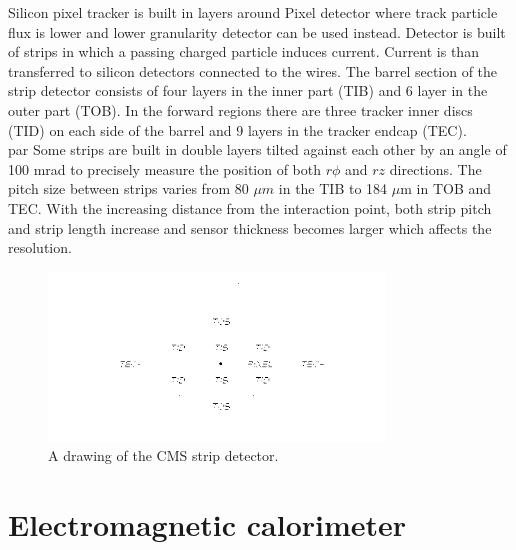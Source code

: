 Silicon pixel tracker is built in layers around Pixel detector where track particle flux is lower and lower granularity detector can be used instead. Detector is built of strips in which a passing charged particle induces current. Current is than transferred to silicon detectors connected to the wires. The barrel section of the strip detector consists of four layers in the inner part (TIB) and 6 layer in the outer part (TOB). In the forward regions there are three tracker inner discs (TID) on each side of the barrel and 9 layers in the tracker endcap (TEC). 
\\par Some strips are built in double layers tilted against each other by an angle of 100 mrad to precisely measure the position of both $r\phi$ and $rz$ directions. The pitch size between strips varies from 80 $\mu m$ in the TIB to 184 $\mu$m in TOB and TEC. With the increasing distance from the interaction point, both strip pitch and strip length increase and sensor thickness becomes larger which affects the resolution.    

\begin{figure}[htbp]
	\centering
		\includegraphics[width=0.8\textwidth]{Figures/strip_detector.png}
	\caption[CMS Strip Detector]{A drawing of the CMS strip detector. \cite{Chatrchyan:2008aa}}
	\label{fig:strips}
\end{figure}


\section{Electromagnetic calorimeter}

